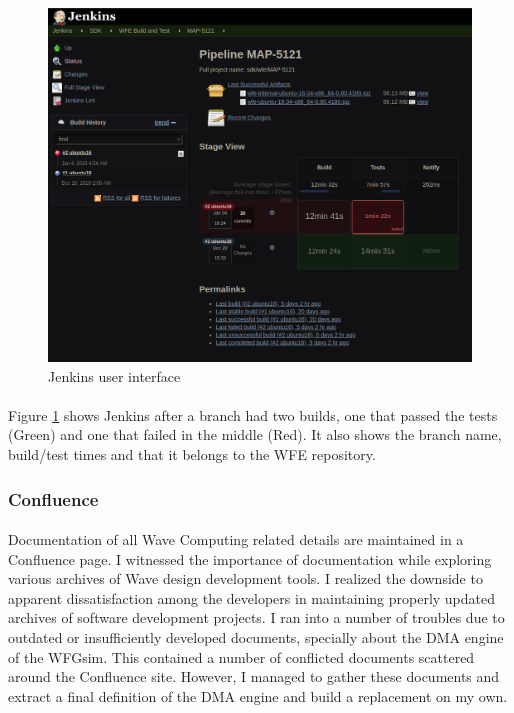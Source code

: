 \begin{figure}[H]
    \centering  
    \includegraphics[trim=0cm 0cm 0cm 0cm, clip=true,scale=0.6]{figures/jenkins.png}
    \caption{Jenkins user interface\label{Fig:jenk}}\vspace{-4mm}
    \end{figure}

\paragraph{}
Figure \ref{Fig:jenk} shows Jenkins after a branch had two builds, one that passed the tests (Green) and one that failed in the middle (Red). It also shows the branch name, build/test times and that it belongs to the WFE repository.

\subsubsection{Confluence}
\paragraph{}
Documentation of all Wave Computing related details are maintained in a Confluence page. I witnessed the importance of documentation while exploring various archives of Wave design development tools. I realized the downside to apparent dissatisfaction among the developers in maintaining properly updated archives of software development projects. I ran into a number of troubles due to outdated or insufficiently developed documents, specially about the DMA engine of the WFGsim. This contained a number of conflicted documents scattered around the Confluence site. However, I managed to gather these documents and extract a final definition of the DMA engine and build a replacement on my own.

